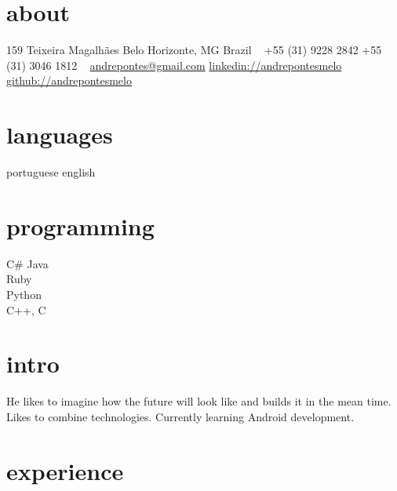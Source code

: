 \documentclass[]{friggeri-cv}
\begin{document}


\begin{aside} %
\section{about}
159 Teixeira Magalhães
Belo Horizonte, MG
Brazil
~
+55 (31) 9228 2842
+55 (31) 3046 1812
~
\href{mailto:andrepontes@gmail.com}{andrepontes@gmail.com}
\href{https://br.linkedin.com/in/andrepontesmelo}{linkedin://andrepontesmelo}
\href{https://github.com/andrepontesmelo}{github://andrepontesmelo}
\section{languages}
portuguese
english
\section{programming}
C\#
Java\\Ruby\\Python\\C++, C
\end{aside}

\section{intro}
He likes to imagine how the future will look like and builds it in the mean time. Likes to combine technologies. Currently learning Android development.

\section{experience}
\end{document}
